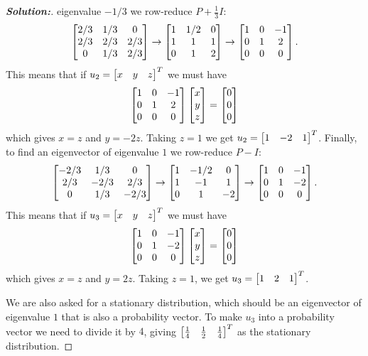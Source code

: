 \documentclass[a4paper]{amsart}
\theoremstyle{definition}
\newenvironment{solution}{\begin{proof}[\textbf{Solution:}] \vphantom{u}}{\end{proof}}
\begin{document}
\begin{solution}
 eigenvalue $-1/3$ we row-reduce $P+\frac{1}{3}I$:
 \[ \left[\begin{matrix} 2/3 & 1/3 & 0 \\ 2/3 & 2/3 & 2/3 \\ 0 & 1/3 & 2/3 \end{matrix}\right] 
    \to 
    \left[\begin{matrix} 1 & 1/2 & 0 \\ 1 & 1 & 1 \\ 0 & 1 & 2 \end{matrix}\right]
    \to
    \left[\begin{matrix} 1 & 0 & -1 \\ 0 & 1 & 2 \\ 0 & 0 & 0 \end{matrix}\right].
 \]
 This means that if $u_2=\left[\begin{matrix} x&y&z\end{matrix}\right]^T$ we must have
 \[ \left[\begin{matrix} 1 & 0 & -1 \\ 0 & 1 & 2 \\ 0 & 0 & 0 \end{matrix}\right]
     \left[\begin{matrix} x \\ y \\ z\end{matrix}\right] = \left[\begin{matrix} 0 \\ 0 \\ 0 \end{matrix}\right] 
 \]
 which gives $x=z$ and $y=-2z$.  Taking $z=1$ we get
 $u_2=\left[\begin{matrix} 1&-2&1\end{matrix}\right]^T$.  Finally, to find an eigenvector of
 eigenvalue $1$ we row-reduce $P-I$:
 \[ \left[\begin{matrix} -2/3 & 1/3 & 0 \\ 2/3 & -2/3 & 2/3 \\ 0 & 1/3 & -2/3 \end{matrix}\right] 
    \to 
    \left[\begin{matrix} 1 & -1/2 & 0 \\ 1 & -1 & 1 \\ 0 & 1 & -2 \end{matrix}\right]
    \to
    \left[\begin{matrix} 1 & 0 & -1 \\ 0 & 1 & -2 \\ 0 & 0 & 0 \end{matrix}\right].
 \]
 This means that if $u_3=\left[\begin{matrix} x&y&z\end{matrix}\right]^T$ we must have
 \[ \left[\begin{matrix} 1 & 0 & -1 \\ 0 & 1 & -2 \\ 0 & 0 & 0 \end{matrix}\right]
     \left[\begin{matrix} x \\ y \\ z\end{matrix}\right] = \left[\begin{matrix} 0 \\ 0 \\ 0 \end{matrix}\right] 
 \]
 which gives $x=z$ and $y=2z$.  Taking $z=1$, we get
 $u_3=\left[\begin{matrix} 1&2&1\end{matrix}\right]^T$.  

 We are also asked for a stationary distribution, which should be an
 eigenvector of eigenvalue $1$ that is also a probability vector.  To
 make $u_3$ into a probability vector we need to divide it by $4$,
 giving $\left[\begin{matrix} \frac{1}{4}&\frac{1}{2}&\frac{1}{4}\end{matrix}\right]^T$ as the
 stationary distribution.
\end{solution}
\end{document}
